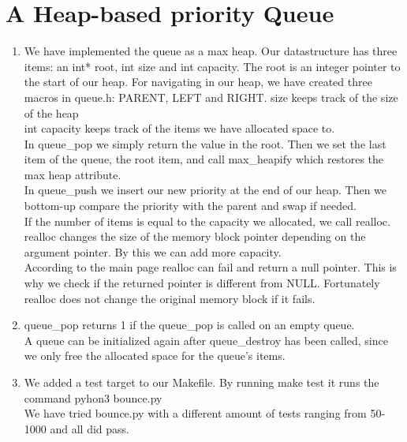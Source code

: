 \documentclass[12pt]{article}
\begin{document}
\section*{A Heap-based priority Queue}
\begin{enumerate}
  \item We have implemented the queue as a max heap. Our datastructure has three items: an int* root, int size and int capacity. The root is an integer pointer to the start of our heap. For navigating in our heap, we have created three macros in queue.h: PARENT, LEFT and RIGHT.
size keeps track of the size of the heap\\
int capacity keeps track of the items we have allocated space to.\\
In queue\_pop we simply return the value in the root. Then we set the last item of the queue, the root item, and call max\_heapify which restores the max heap attribute.\\
In queue\_push we insert our new priority at the end of our heap. Then we bottom-up compare the priority with the parent and swap if needed. \\
If the number of items is equal to the capacity we allocated, we call realloc. realloc changes the size of the memory block pointer depending on the argument pointer. By this we can add more capacity.\\
According to the main page realloc can fail and return a null pointer. This is why we check if the returned pointer is different from NULL. Fortunately realloc does not change the original memory block if it fails.
\item queue\_pop returns 1 if the queue\_pop is called on an empty queue.\\
A queue can be initialized again after queue\_destroy has been called, since we only free the allocated space for the queue's items.
\item We added a test target to our Makefile. By running make test it runs the command pyhon3 bounce.py\\
We have tried bounce.py with a different amount of tests ranging from 50-1000 and all did pass.\\
\end{enumerate}
\end{document}
